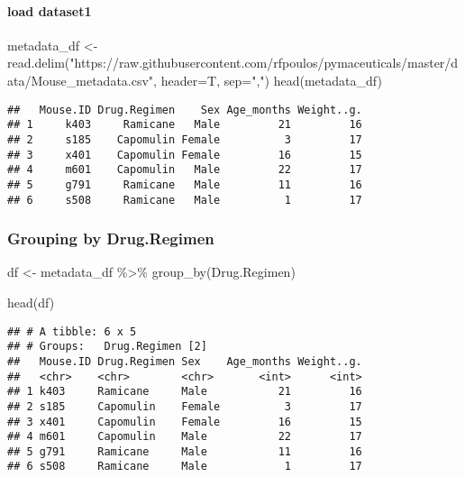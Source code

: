 \documentclass[
]{article}
\newenvironment{Shaded}{\begin{snugshade}}{\end{snugshade}}
\newcommand{\AttributeTok}[1]{\textcolor[rgb]{0.77,0.63,0.00}{#1}}
\newcommand{\FunctionTok}[1]{\textcolor[rgb]{0.00,0.00,0.00}{#1}}
\newcommand{\NormalTok}[1]{#1}
\newcommand{\OtherTok}[1]{\textcolor[rgb]{0.56,0.35,0.01}{#1}}
\newcommand{\SpecialCharTok}[1]{\textcolor[rgb]{0.00,0.00,0.00}{#1}}
\newcommand{\StringTok}[1]{\textcolor[rgb]{0.31,0.60,0.02}{#1}}
\begin{document}
\hypertarget{load-dataset1}{%
\paragraph{load dataset1}\label{load-dataset1}}

\begin{Shaded}
\begin{Highlighting}[]
\NormalTok{metadata\_df }\OtherTok{\textless{}{-}} \FunctionTok{read.delim}\NormalTok{(}\StringTok{"https://raw.githubusercontent.com/rfpoulos/pymaceuticals/master/data/Mouse\_metadata.csv"}\NormalTok{, }\AttributeTok{header=}\NormalTok{T, }\AttributeTok{sep=}\StringTok{","}\NormalTok{)}
\FunctionTok{head}\NormalTok{(metadata\_df)}
\end{Highlighting}
\end{Shaded}

\begin{verbatim}
##   Mouse.ID Drug.Regimen    Sex Age_months Weight..g.
## 1     k403     Ramicane   Male         21         16
## 2     s185    Capomulin Female          3         17
## 3     x401    Capomulin Female         16         15
## 4     m601    Capomulin   Male         22         17
## 5     g791     Ramicane   Male         11         16
## 6     s508     Ramicane   Male          1         17
\end{verbatim}

\hypertarget{grouping-by-drug.regimen}{%
\subsubsection{Grouping by
Drug.Regimen}\label{grouping-by-drug.regimen}}

\begin{Shaded}
\begin{Highlighting}[]
\NormalTok{df }\OtherTok{\textless{}{-}}\NormalTok{ metadata\_df }\SpecialCharTok{\%\textgreater{}\%}
  \FunctionTok{group\_by}\NormalTok{(Drug.Regimen) }

\FunctionTok{head}\NormalTok{(df)}
\end{Highlighting}
\end{Shaded}

\begin{verbatim}
## # A tibble: 6 x 5
## # Groups:   Drug.Regimen [2]
##   Mouse.ID Drug.Regimen Sex    Age_months Weight..g.
##   <chr>    <chr>        <chr>       <int>      <int>
## 1 k403     Ramicane     Male           21         16
## 2 s185     Capomulin    Female          3         17
## 3 x401     Capomulin    Female         16         15
## 4 m601     Capomulin    Male           22         17
## 5 g791     Ramicane     Male           11         16
## 6 s508     Ramicane     Male            1         17
\end{verbatim}
\end{document}
